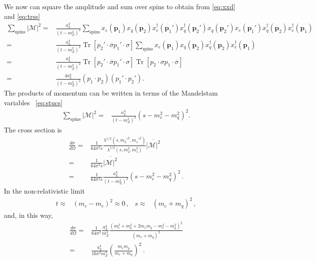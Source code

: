 We now can square the amplitude and sum over spins to obtain from \eqref{eq:xxd} and \eqref{eq:trss}
\begin{align}
  \sum_{\text{spins}} |\mathcal{M}|^2=&
  \frac{a_L^4}{\left( t-m_Z^2 \right)^2}
  \sum_{\text{spins}}x_e(\mathbf{p}_1)x_q(\mathbf{p}_2) x^{\dagger}_e(\mathbf{p}_1')  x^{\dagger}_q(\mathbf{p}_2') 
 x_q(\mathbf{p}_2') x_e(\mathbf{p}_1')  x_q^{\dagger}(\mathbf{p}_2)  x_e^{\dagger}(\mathbf{p}_1) \nonumber\\
  =& \frac{a_L^4}{\left( t-m_Z^2 \right)^2} \operatorname{Tr}\left[p_2'\cdot\overline{\sigma} p_1'\cdot\sigma  \right]
  \sum_{\text{spins}}x_e(\mathbf{p}_1)x_q(\mathbf{p}_2)  x_q^{\dagger}(\mathbf{p}_2)  x_e^{\dagger}(\mathbf{p}_1) \nonumber\\
  =& \frac{a_L^4}{\left( t-m_Z^2 \right)^2} \operatorname{Tr}\left[p_2'\cdot\overline{\sigma} p_1'\cdot\sigma  \right]
 \operatorname{Tr}\left[p_2\cdot\sigma  p_1\cdot\overline{\sigma}  \right] \nonumber\\
  =& \frac{4a_L^4}{\left( t-m_Z^2 \right)^2}\left( p_1\cdot p_2 \right)\left( p_1'\cdot p_2' \right).
\end{align}
The products of momentum can be written in terms of the Mandelstam variables~ \eqref{eq:stucs}
\begin{align}
   \sum_{\text{spins}} |\mathcal{M}|^2=& \frac{a_L^4}{\left( t-m_Z^2 \right)^2}\left( s-m_e^2-m_q^2 \right)^2.
\end{align}
The cross section is 
\begin{align}
     \frac{d\sigma}{d\Omega}=&\frac{1}{64\pi^2s}
\frac{\lambda^{1/2}(s,{m_2'}^2,{m_1'}^2)}{\lambda^{1/2}(s,m_2^2,m_1^2)}
\overline{|\mathcal{M}|^2} \nonumber\\
=&\frac{1}{64\pi^2s}\overline{|\mathcal{M}|^2} \nonumber\\
=&\frac{1}{64\pi^2s}\frac{a_L^4}{\left( t-m_Z^2 \right)^2}\left( s-m_e^2-m_q^2 \right)^2 \,.
\end{align}
In the non-relativistic limit
\begin{align}
  t\approx& (m_e-m_e)^2\approx 0\,,& 
  s\approx& (m_e+m_q)^2\,,
\end{align}
and, in this way,
\begin{align}
       \frac{d\sigma}{d\Omega}=&\frac{1}{64\pi^2}\frac{a_L^4}{m_Z^4}\frac{\left( m_e^2+m_q^2+2m_em_q-m_e^2-m_q^2 \right)^2}{(m_e+m_q)^2} \nonumber\\
                    =&\frac{a_L^4}{16\pi^2m_Z^4}\left( \frac{m_em_q}{m_e+m_q} \right)^2\,.
\end{align}



